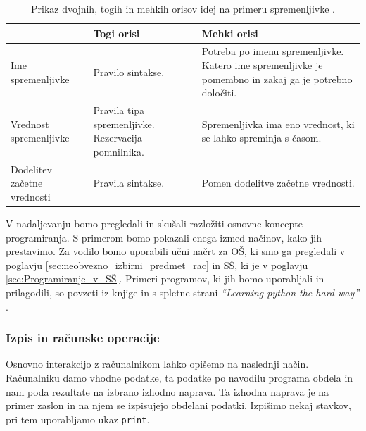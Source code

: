 \begin{table}[!h]

\caption{Prikaz dvojnih, togih in mehkih orisov idej na primeru
  spremenljivke \cite{guideTCS}. }
\label{tab:koncept_spremenljivka}
\begin{tabular}{
  | p{} |
  p{} |
  p{} | }
  \hline
  \rowcolor{sbase01!100}
  & \textbf{Togi orisi} & \textbf{Mehki orisi}\\
  \hline
  Ime spremenljivke & Pravilo sintakse. & Potreba po imenu
                                          spremenljivke. Katero ime
                                          spremenljivke je pomembno in
                                          zakaj ga je potrebno
                                          določiti.\\
  \hline
  Vrednost spremenljivke & Pravila tipa spremenljivke. Rezervacija
                           pomnilnika. & Spremenljivka ima eno
                                         vrednost, ki se lahko
                                         spreminja s časom.\\
  \hline
  Dodelitev začetne vrednosti & Pravila sintakse. & Pomen dodelitve
                                                  začetne vrednosti.\\
  \hline

\end{tabular}
\end{table}

V nadaljevanju bomo pregledali in skušali razložiti osnovne koncepte programiranja. S primerom bomo pokazali enega izmed načinov, kako
jih prestavimo. Za vodilo bomo uporabili učni načrt za OŠ, ki smo ga
pregledali v poglavju \ref{sec:neobvezno_izbirni_predmet_rac} in SŠ,
ki je v poglavju \ref{sec:Programiranje_v_SŠ}. Primeri programov, ki
jih bomo uporabljali in prilagodili, so povzeti iz knjige in s spletne
strani \emph{``Learning python the hard way''} \cite{web:PTHardWay}.


\subsubsection{Izpis in računske operacije}
\label{sec:izpis_rac_operacije}

Osnovno interakcijo z računalnikom lahko opišemo na naslednji
način. Računalniku damo vhodne podatke, ta podatke po navodilu
programa obdela in nam poda rezultate na izbrano izhodno naprava. Ta
izhodna naprava je na primer zaslon in na njem se izpisujejo obdelani
podatki. Izpišimo nekaj stavkov, pri tem uporabljamo ukaz
\texttt{print}.

